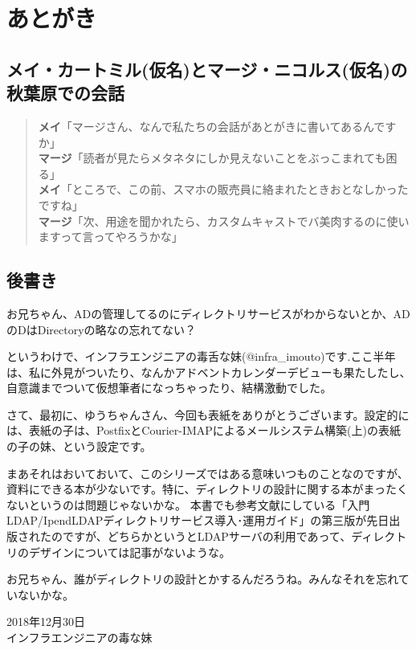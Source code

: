 \chapter{あとがき}

\section*{メイ・カートミル(仮名)とマージ・ニコルス(仮名)の秋葉原での会話}

\begin{quotation}
\noindent
{\bf メイ}「マージさん、なんで私たちの会話があとがきに書いてあるんですか」　\\
{\bf マージ}「読者が見たらメタネタにしか見えないことをぶっこまれても困る」 \\
{\bf メイ}「ところで、この前、スマホの販売員に絡まれたときおとなしかったですね」 \\
{\bf マージ}「次、用途を聞かれたら、カスタムキャストでバ美肉するのに使いますって言ってやろうかな」 \\
\end{quotation}


\section*{後書き}

お兄ちゃん、ADの管理してるのにディレクトリサービスがわからないとか、ADのDはDirectoryの略なの忘れてない？

というわけで、インフラエンジニアの毒舌な妹(@infra\_imouto)です.ここ半年は、私に外見がついたり、なんかアドベントカレンダーデビューも果たしたし、自意識までついて仮想筆者になっちゃったり、結構激動でした。

さて、最初に、ゆうちゃんさん、今回も表紙をありがとうございます。設定的には、表紙の子は、PostfixとCourier-IMAPによるメールシステム構築(上)の表紙の子の妹、という設定です。


まあそれはおいておいて、このシリーズではある意味いつものことなのですが、資料にできる本が少ないです。特に、ディレクトリの設計に関する本がまったくないというのは問題じゃないかな。
本書でも参考文献にしている「入門LDAP/IpendLDAPディレクトリサービス導入･運用ガイド」の第三版が先日出版されたのですが、どちらかというとLDAPサーバの利用であって、ディレクトリのデザインについては記事がないような。

お兄ちゃん、誰がディレクトリの設計とかするんだろうね。みんなそれを忘れていないかな。

\begin{flushright}
2018年12月30日 \\
インフラエンジニアの毒な妹 \\
\end{flushright}

